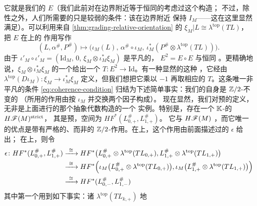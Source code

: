 它就是我们的 $E$（我们此前对在边界附近等于恒同的\trAutomorphism{}考虑过这个构造；
不过，除\trExact{}性之外，人们所需要的只是较弱的条件：该\trAutomorphism{}在边界附近
保持 $I_M$——这在这里显然满足）。可以利用来自 \cref{thm:grading-relative-orientation}
的\trIsomorphism{} $\xi_M|L\cong\lambda^{\mathrm{top}}(TL)$，把 $E$ 在\trObject{}上的
作用写作
\begin{equation}\label{eq:involution-on-objects}
(L,\alpha^{\#},P^{\#})\longmapsto
\bigl(\iota_M(L),\,\alpha^{\#}\circ\iota_M,\,
\iota_M^*(P^{\#}\otimes\lambda^{\mathrm{top}}(TL))\bigr).
\end{equation}
由于 $\iota'_M\circ\iota'_M=(\mathrm{Id}_M,\,0,\,\xi_M\otimes\iota_M^*\xi_M)$ 是平凡的，
$E^2=E\circ E$ 与恒同\trFunctor{} \trIsomorphic。更精确地说，$\xi_M\otimes\iota_M^*\xi_M$
的一个\trTrivialization{}给出一个\trIsomorphism{} $T\colon E^2\to\mathrm{Id}$。有一种显然的这种%
\trTrivialization{}，它经由\trIsomorphism{} $\lambda^{\mathrm{top}}(D\iota_M)\colon\xi_M\to\iota_M^*\xi_M$
定义，但我们想把它乘以 $-1$ 再取相应的 $T$。这条唯一非平凡的\trCoherent{}条件
\eqref{eq:coherence-condition} 归结为下述简单事实：我们的\trTrivialization{}自身是 $\mathbb{Z}/2$-不变的
（所用的作用由按 $\iota_M$ \trPullback{}并交换两个因子构成）。
现在显然，我们对预\trEquivariant{}\trBrane{}的定义，无非是上面进行的那个抽象代数构造的一个
实例。特别是，存在一个 $\mathbb{K}$-\trLinear{}的\trGraded\trCategory{} $H\mathscr{F}(M)^{\mathrm{strict}}$，
其\trObject{}是预\trEquivariant{}\trBrane，\trMorphism{}空间为 $HF^*(L^{\#}_{0,+},L^{\#}_{1,+})$。
它与 $H\mathscr{F}(M)$ \trEquivalence，而它唯一的优点是带有严格的、而非\trCoherent{}的
$\mathbb{Z}/2$-作用。在\trObject{}上，这个作用由前面描述过的\trInvolution{} $\epsilon$ 给出；
在\trMorphism{}上，则令
\begin{equation}\label{eq:involution-on-morphisms}
\begin{aligned}
\epsilon\colon HF^*(L^{\#}_{0,+},L^{\#}_{1,+})
&\xrightarrow{\ \cong\ }
HF^*\bigl(L^{\#}_{0,+}\otimes\lambda^{\mathrm{top}}(TL_{0,+}),
L^{\#}_{1,+}\otimes\lambda^{\mathrm{top}}(TL_{1,+})\bigr)\\
&\xrightarrow{\ \cong\ }
HF^*\Bigl(\iota_M\bigl(L^{\#}_{0,+}\otimes\lambda^{\mathrm{top}}(TL_{0,+})\bigr),
\iota_M\bigl(L^{\#}_{1,+}\otimes\lambda^{\mathrm{top}}(TL_{1,+})\bigr)\Bigr)\\
&\xrightarrow{\ \cong\ } HF^*(L^{\#}_{0,-},L^{\#}_{1,-})
\end{aligned}
\end{equation}
其中第一个\trIsomorphism{}用到如下事实：诸 $\lambda^{\mathrm{top}}(TL_{k,+})$ \trCanonical{}地%
